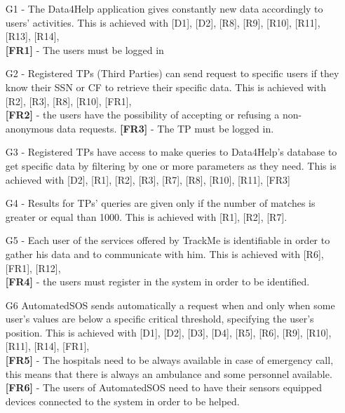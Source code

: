 \begin{itemize}
\item [G1] - The Data4Help application gives constantly new data accordingly to users' activities.
This is achieved with [D1], [D2], [R8], [R9], [R10], [R11], [R13], [R14],\\
\textbf{[FR1]} - The users must be logged in
\item [G2] - Registered TPs (Third Parties) can send request to specific users if they know their SSN or CF to retrieve their specific data.
This is achieved with [R2], [R3], [R8], [R10], [FR1], \\
\textbf{[FR2]} - the users have the possibility of accepting or refusing a non-anonymous data requests. \newline
\textbf{[FR3]} - The TP must be logged in.


\item [G3] - Registered TPs have access to make queries to Data4Help's database to get specific data by filtering by one or more parameters as they need.
This is achieved with [D2], [R1], [R2], [R3], [R7], [R8], [R10], [R11], [FR3]


\item [G4] - Results for TPs' queries are given only if the number of matches is greater or equal than 1000.
This is achieved with [R1], [R2], [R7].


\item [G5] - Each user of the services offered by TrackMe is identifiable in order to gather his data and to communicate with him.
This is achieved with 
[R6], [FR1], [R12], \\
\textbf{[FR4]} - the users must register in the system in order to be identified.

\item [G6] AutomatedSOS sends automatically a request when and only when some user's values are below a specific critical threshold, specifying the user's position.
This is achieved with [D1], [D2], [D3], [D4], [R5], [R6], [R9], [R10], [R11], [R14], [FR1], \\
\textbf{[FR5]} - The hospitals need to be always available in case of emergency call, this means that there is always an ambulance and some personnel available. \\
\textbf{[FR6]} - The users of AutomatedSOS need to have their sensors equipped devices connected to the system in order to be helped.



\end{itemize}
